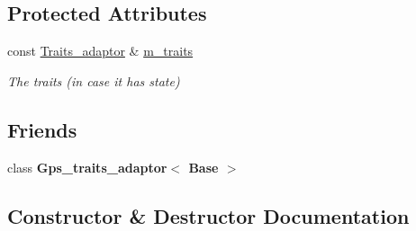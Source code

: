 \subsection*{Protected Attributes}
\begin{DoxyCompactItemize}
\item 
\mbox{\label{class_c_g_a_l_1_1_gps__traits__adaptor_1_1_construct__vertex__2_a4327f99990af235a15d4b36794b0acf8}} 
const \mbox{\hyperlink{class_c_g_a_l_1_1_gps__traits__adaptor}{Traits\+\_\+adaptor}} \& \mbox{\hyperlink{class_c_g_a_l_1_1_gps__traits__adaptor_1_1_construct__vertex__2_a4327f99990af235a15d4b36794b0acf8}{m\+\_\+traits}}
\begin{DoxyCompactList}\small\item\em The traits (in case it has state) \end{DoxyCompactList}\end{DoxyCompactItemize}
\subsection*{Friends}
\begin{DoxyCompactItemize}
\item 
\mbox{\label{class_c_g_a_l_1_1_gps__traits__adaptor_1_1_construct__vertex__2_a4d2b49536a2c62dc9d864d67dc9133b9}} 
class {\bfseries Gps\+\_\+traits\+\_\+adaptor$<$ Base $>$}
\end{DoxyCompactItemize}


\subsection{Constructor \& Destructor Documentation}
\mbox{\label{class_c_g_a_l_1_1_gps__traits__adaptor_1_1_construct__vertex__2_ade4df041a1e859d7c17c0ba660bdead6}} 
